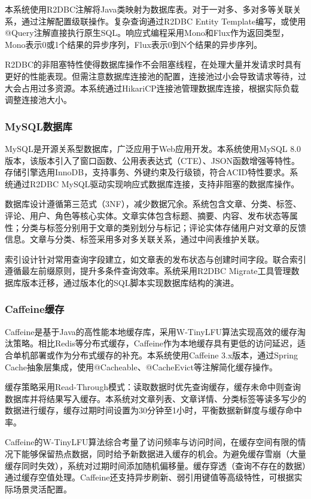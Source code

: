 \documentclass[UTF8,AutoFakeBold=1,AutoFakeSlant,zihao=-4]{SCAU}
\begin{document}
本系统使用R2DBC注解将Java类映射为数据库表。对于一对多、多对多等关联关系，通过注解配置级联操作。复杂查询通过R2DBC Entity Template编写，或使用@Query注解直接执行原生SQL。响应式编程采用Mono和Flux作为返回类型，Mono表示0或1个结果的异步序列，Flux表示0到N个结果的异步序列。

R2DBC的非阻塞特性使得数据库操作不会阻塞线程，在处理大量并发请求时具有更好的性能表现。但需注意数据库连接池的配置，连接池过小会导致请求等待，过大会占用过多资源。本系统通过HikariCP连接池管理数据库连接，根据实际负载调整连接池大小。

\subsubsection{MySQL数据库}

MySQL是开源关系型数据库，广泛应用于Web应用开发。本系统使用MySQL 8.0版本，该版本引入了窗口函数、公用表表达式（CTE）、JSON函数增强等特性。存储引擎选用InnoDB，支持事务、外键约束及行级锁，符合ACID特性要求。系统通过R2DBC MySQL驱动实现响应式数据库连接，支持非阻塞的数据库操作。

数据库设计遵循第三范式（3NF），减少数据冗余。系统包含文章、分类、标签、评论、用户、角色等核心实体。文章实体包含标题、摘要、内容、发布状态等属性；分类与标签分别用于文章的类别划分与标记；评论实体存储用户对文章的反馈信息。文章与分类、标签采用多对多关联关系，通过中间表维护关联。

索引设计针对常用查询字段建立，如文章表的发布状态与创建时间字段。联合索引遵循最左前缀原则，提升多条件查询效率。系统采用R2DBC Migrate工具管理数据库版本迁移，通过版本化的SQL脚本实现数据库结构的演进。

\subsubsection{Caffeine缓存}

Caffeine是基于Java的高性能本地缓存库，采用W-TinyLFU算法实现高效的缓存淘汰策略。相比Redis等分布式缓存，Caffeine作为本地缓存具有更低的访问延迟，适合单机部署或作为分布式缓存的补充。本系统使用Caffeine 3.x版本，通过Spring Cache抽象层集成，使用@Cacheable、@CacheEvict等注解简化缓存操作。

缓存策略采用Read-Through模式：读取数据时优先查询缓存，缓存未命中则查询数据库并将结果写入缓存。本系统对文章列表、文章详情、分类标签等读多写少的数据进行缓存，缓存过期时间设置为30分钟至1小时，平衡数据新鲜度与缓存命中率。

Caffeine的W-TinyLFU算法综合考量了访问频率与访问时间，在缓存空间有限的情况下能够保留热点数据，同时给予新数据进入缓存的机会。为避免缓存雪崩（大量缓存同时失效），系统对过期时间添加随机偏移量。缓存穿透（查询不存在的数据）通过缓存空值处理。Caffeine还支持异步刷新、弱引用键值等高级特性，可根据实际场景灵活配置。
\end{document}
